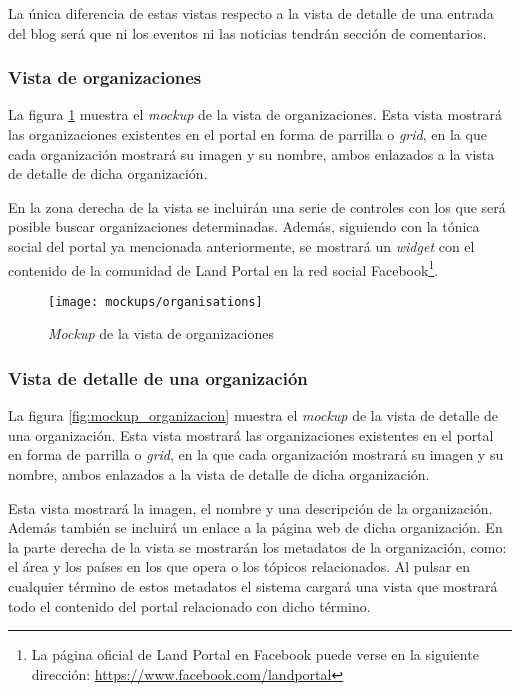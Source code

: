 La única diferencia de estas vistas respecto a la vista de detalle de una entrada del blog será que ni los eventos ni las noticias tendrán sección de comentarios.


\subsubsection{Vista de organizaciones}
La figura \ref{fig:mockup_organizaciones} muestra el \textit{mockup} de la vista de organizaciones. Esta vista mostrará las organizaciones existentes en el portal en forma de parrilla o \textit{grid}, en la que cada organización mostrará su imagen y su nombre, ambos enlazados a la vista de detalle de dicha organización.

En la zona derecha de la vista se incluirán una serie de controles con los que será posible buscar organizaciones determinadas.  Además, siguiendo con la tónica social del portal ya mencionada anteriormente, se mostrará un \textit{widget} con el contenido de la comunidad de Land Portal en la red social Facebook\footnote{La página oficial de Land Portal en Facebook puede verse en la siguiente dirección: \url{https://www.facebook.com/landportal}}.

\begin{figure}[h]
	\centering
	\texttt{[image: mockups/organisations]}
	\caption{\textit{Mockup} de la vista de organizaciones}
	\label{fig:mockup_organizaciones}
\end{figure}


\subsubsection{Vista de detalle de una organización}
La figura \ref{fig:mockup_organizacion} muestra el \textit{mockup} de la vista de detalle de una organización. Esta vista mostrará las organizaciones existentes en el portal en forma de parrilla o \textit{grid}, en la que cada organización mostrará su imagen y su nombre, ambos enlazados a la vista de detalle de dicha organización.

Esta vista mostrará la imagen, el nombre y una descripción de la organización.  Además también se incluirá un enlace a la página web de dicha organización.  En la parte derecha de la vista se mostrarán los metadatos de la organización, como: el área y los países en los que opera o los tópicos relacionados.  Al pulsar en cualquier término de estos metadatos el sistema cargará una vista que mostrará todo el contenido del portal relacionado con dicho término.

